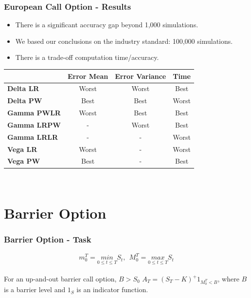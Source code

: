 \documentclass[12pt]{beamer}
\begin{document}
\begin{frame}
\frametitle{European Call Option - Results}
\begin{itemize}
  \item There is a significant accuracy gap beyond 1,000 simulations.
  \item We based our conclusions on the industry standard: 100,000 simulations.
  \item There is a trade-off computation time/accuracy.
\end{itemize}



\begin{table}
  \centering
\begin{tabular}{|l|c|c|c|}
\hline
& \textbf{Error Mean} & \textbf{Error Variance} & \textbf{Time} \\ \hline
\textbf{Delta LR} & Worst & Worst & Best\\
\textbf{Delta PW} & Best & Best & Worst\\ \hline
\textbf{Gamma PWLR} & Worst & Best & Best\\
\textbf{Gamma LRPW} & - & Worst & Best\\
\textbf{Gamma LRLR} & - & - & Worst\\ \hline
\textbf{Vega LR} & Worst & - & Worst\\
\textbf{Vega PW} & Best & - & Best\\ \hline
\end{tabular}\\

\end{table}

\end{frame}




\section{Barrier Option}
\frame{\tableofcontents[currentsection]}
\begin{frame}
\frametitle{Barrier Option - Task}
$$m^T_{0} =\underset{0 \leq t \leq T}{min}  S_t, \ \   M^T_{0} = \underset{0 \leq t \leq T}{max} S_t$$\\

For an up-and-out barrier call option, $B > S_0$ $A_T=(S_T-K)^+1_{M^T_0 < B}$, where $B$ is a barrier level and $1_S$ is an indicator function.

\end{frame}
\end{document}
